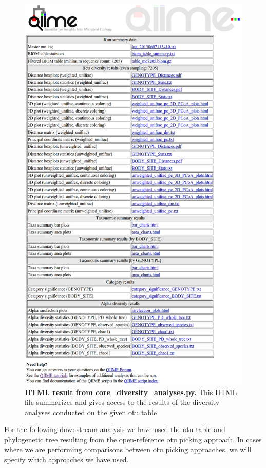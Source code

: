 \begin{figure}[htbp]
\includegraphics[width=0.75\columnwidth]{chapter_book_figures/Figure_4.jpg}
\caption[HTML result from core\_diversity\_analyses.py]{\textbf{HTML result from core\_diversity\_analyses.py.}
This HTML file summarizes and gives access to the results of the diversity analyses conducted on the given \gls{otu} table}
\label{bfigure4}
\end{figure}

For the following downstream analysis we have used the \gls{otu} table and phylogenetic
tree resulting from the open-reference \gls{otu} picking approach. In cases where we
are performing comparisons between \gls{otu} picking approaches, we will specify
which approaches we have used.

